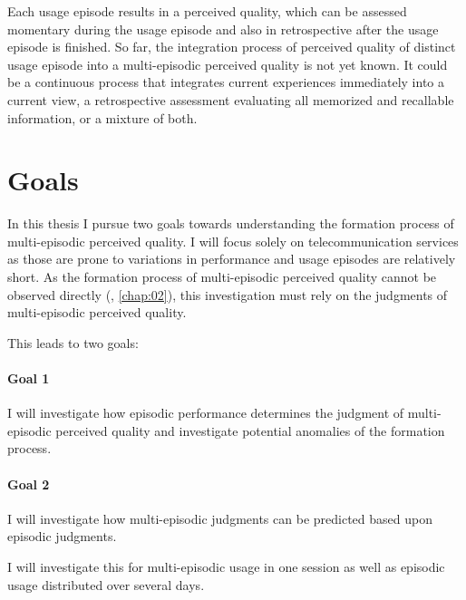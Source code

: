 Each usage episode results in a perceived quality, which can be assessed momentary during the usage episode and also in retrospective after the usage episode is finished.
So far, the integration process of perceived quality of distinct usage episode into a multi-episodic perceived quality is not yet known.
It could be a continuous process that integrates current experiences immediately into a current view, a retrospective assessment evaluating all memorized and recallable information, or a mixture of both.

\section{Goals}
In this thesis I pursue two goals towards understanding the formation process of multi-episodic perceived quality.
I will focus solely on telecommunication services as those are prone to variations in performance and usage episodes are relatively short.
As the formation process of multi-episodic perceived quality cannot be observed directly (\cf, \autoref{chap:02}), this investigation must rely on the judgments of multi-episodic perceived quality.

This leads to two goals:

\paragraph*{Goal 1}
I will investigate how episodic performance determines the judgment of multi-episodic perceived quality and investigate potential anomalies of the formation process.

\paragraph*{Goal 2}
I will investigate how multi-episodic judgments can be predicted based upon episodic judgments.

I will investigate this for multi-episodic usage in one session as well as episodic usage distributed over several days.

